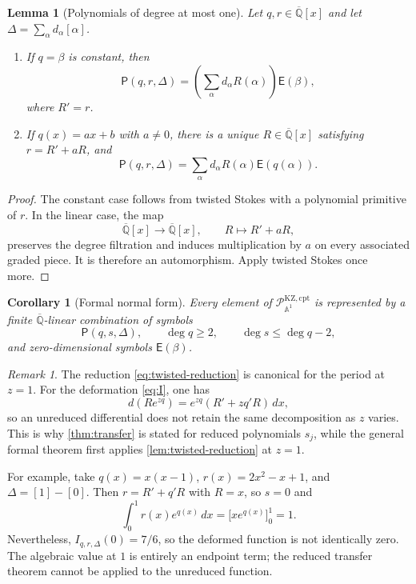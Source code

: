 \documentclass[11pt]{article}
\numberwithin{equation}{section}
\newtheorem{lemma}[lemma]{Lemma}
\newtheorem{corollary}[corollary]{Corollary}
\theoremstyle{definition}
\theoremstyle{remark}
\newtheorem{remark}[remark]{Remark}
\newcommand{\Qbar}{\overline{\mathbb Q}}
\newcommand{\Aone}{\mathbb A^1}
\newcommand{\Pcal}{\mathcal P}
\begin{document}
\begin{lemma}[Polynomials of degree at most one]\label{lem:small-degree}
Let $q,r\in\Qbar[x]$ and let $\Delta=\sum_\alpha d_\alpha[\alpha]$.
\begin{enumerate}[label=\textup{(\roman*)},leftmargin=2.4em]
\item If $q=\beta$ is constant, then
\[
  \mathsf P(q,r,\Delta)
  =\left(\sum_\alpha d_\alpha R(\alpha)\right)\mathsf E(\beta),
\]
where $R'=r$.
\item If $q(x)=ax+b$ with $a\ne0$, there is a unique
$R\in\Qbar[x]$ satisfying $r=R'+aR$, and
\begin{equation}\label{eq:linear-reduction}
  \mathsf P(q,r,\Delta)
  =\sum_\alpha d_\alpha R(\alpha)\mathsf E(q(\alpha)).
\end{equation}
\end{enumerate}
\end{lemma}

\begin{proof}
The constant case follows from twisted Stokes with a polynomial primitive
of $r$.  In the linear case, the map
\[
  \Qbar[x]\longrightarrow\Qbar[x],
  \qquad R\longmapsto R'+aR,
\]
preserves the degree filtration and induces multiplication by $a$ on every
associated graded piece.  It is therefore an automorphism.  Apply twisted
Stokes once more.
\end{proof}

\begin{corollary}[Formal normal form]\label{cor:normal-form}
Every element of $\Pcal_{\Aone}^{\mathrm{KZ,cpt}}$ is represented by a
finite $\Qbar$-linear combination of symbols
\[
  \mathsf P(q,s,\Delta),
  \qquad \deg q\ge2,
  \qquad \deg s\le\deg q-2,
\]
and zero-dimensional symbols $\mathsf E(\beta)$.
\end{corollary}

\begin{remark}\label{rem:reduction-at-one}
The reduction \eqref{eq:twisted-reduction} is canonical for the period at
$z=1$.  For the deformation \eqref{eq:I}, one has
\[
  d(Re^{zq})=e^{zq}(R'+zq'R)\,dx,
\]
so an unreduced differential does not retain the same decomposition as $z$
varies.  This is why \cref{thm:transfer} is stated for reduced
polynomials $s_j$, while the general formal theorem first applies
\cref{lem:twisted-reduction} at $z=1$.

For example, take $q(x)=x(x-1)$, $r(x)=2x^2-x+1$, and
$\Delta=[1]-[0]$.  Then $r=R'+q'R$ with $R=x$, so $s=0$ and
\[
  \int_0^1 r(x)e^{q(x)}\,dx
  =\bigl[xe^{q(x)}\bigr]_0^1=1.
\]
Nevertheless, $I_{q,r,\Delta}(0)=7/6$, so the deformed function is not
identically zero.  The algebraic value at $1$ is entirely an endpoint term;
the reduced transfer theorem cannot be applied to the unreduced function.
\end{remark}
\end{document}
